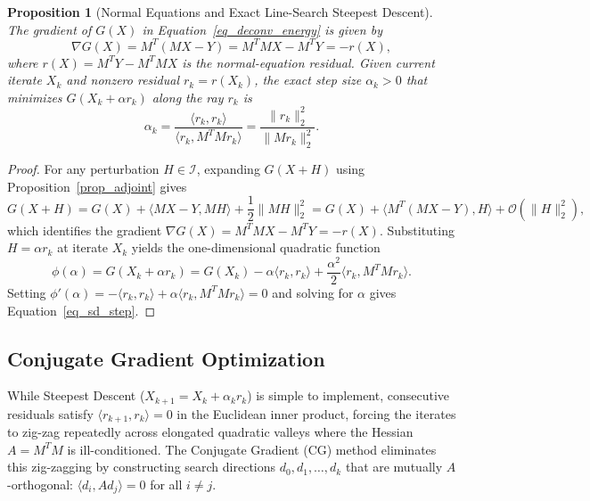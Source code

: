 \documentclass{amsart}
\newtheorem{proposition}[theorem]{Proposition}
\begin{document}
\begin{proposition}[Normal Equations and Exact Line-Search Steepest Descent]\label{prop_sd}
    The gradient of $G(X)$ in Equation~\eqref{eq_deconv_energy} is given by
    \begin{equation}\label{eq_deconv_grad}
        \nabla G(X) = M^T(M X - Y) = M^T M X - M^T Y = -r(X),
    \end{equation}
    where $r(X) = M^T Y - M^T M X$ is the normal-equation residual. Given current iterate $X_k$ and nonzero residual $r_k = r(X_k)$, the exact step size $\alpha_k > 0$ that minimizes $G(X_k + \alpha r_k)$ along the ray $r_k$ is
    \begin{equation}\label{eq_sd_step}
        \alpha_k = \frac{\langle r_k, r_k \rangle}{\langle r_k, M^T M r_k \rangle} = \frac{\|r_k\|_2^2}{\|M r_k\|_2^2}.
    \end{equation}
\end{proposition}
\begin{proof}
    For any perturbation $H \in \mathcal{I}$, expanding $G(X + H)$ using Proposition~\ref{prop_adjoint} gives
    \[
        G(X + H) = G(X) + \langle M X - Y, M H \rangle + \frac{1}{2}\|M H\|_2^2
        = G(X) + \langle M^T(M X - Y), H \rangle + \mathcal{O}(\|H\|_2^2),
    \]
    which identifies the gradient $\nabla G(X) = M^T M X - M^T Y = -r(X)$. Substituting $H = \alpha r_k$ at iterate $X_k$ yields the one-dimensional quadratic function
    \[
        \phi(\alpha) = G(X_k + \alpha r_k) = G(X_k) - \alpha \langle r_k, r_k \rangle + \frac{\alpha^2}{2}\langle r_k, M^T M r_k \rangle.
    \]
    Setting $\phi'(\alpha) = -\langle r_k, r_k \rangle + \alpha \langle r_k, M^T M r_k \rangle = 0$ and solving for $\alpha$ gives Equation~\eqref{eq_sd_step}.
\end{proof}

\subsection{Conjugate Gradient Optimization}
While Steepest Descent ($X_{k+1} = X_k + \alpha_k r_k$) is simple to implement, consecutive residuals satisfy $\langle r_{k+1}, r_k \rangle = 0$ in the Euclidean inner product, forcing the iterates to zig-zag repeatedly across elongated quadratic valleys where the Hessian $A = M^T M$ is ill-conditioned. The Conjugate Gradient (CG) method eliminates this zig-zagging by constructing search directions $d_0, d_1, \dots, d_k$ that are mutually $A$-orthogonal: $\langle d_i, A d_j \rangle = 0$ for all $i \neq j$.
\end{document}
